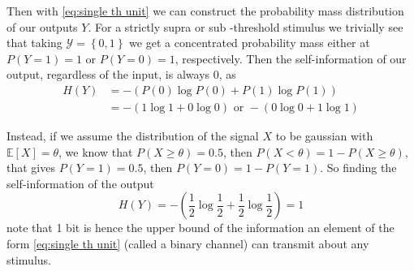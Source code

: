 Then with \ref{eq:single th unit} we can construct the probability mass distribution of our outputs $Y$. 
For a strictly supra or sub -threshold stimulus we trivially see that taking $\mathcal{Y} = \left\{0,1\right\}$ we get a concentrated probability mass either at $P(Y=1)=1$ or $P(Y=0)=1$, respectively. 
Then the self-information of our output, regardless of the input, is always 0, as
\begin{align}
    H(Y) &= -\left(P(0)\log P(0)+P(1)\log P(1)\right)\\
    &=- \left(1\log 1 + 0\log 0\right) \text{ or } - \left(0\log0 + 1\log 1\right)
\end{align}

Instead, if we assume the distribution of the signal $X$ to be gaussian with $\mathbb{E}[X] = \theta$, we know that $P(X \geq \theta) = 0.5$, then $P(X <\theta) = 1 - P(X \geq \theta)$, that gives $P(Y = 1) = 0.5$, then $P(Y = 0) = 1 - P(Y = 1)$. 
So finding the self-information of the output
\begin{equation}
    H(Y) = -\left(\frac{1}{2}\log\frac{1}{2} + \frac{1}{2}\log\frac{1}{2}\right) = 1
\end{equation}
note that 1 bit is hence the upper bound of the information an element of the form \ref{eq:single th unit} (called a binary channel) can transmit about any stimulus. 

